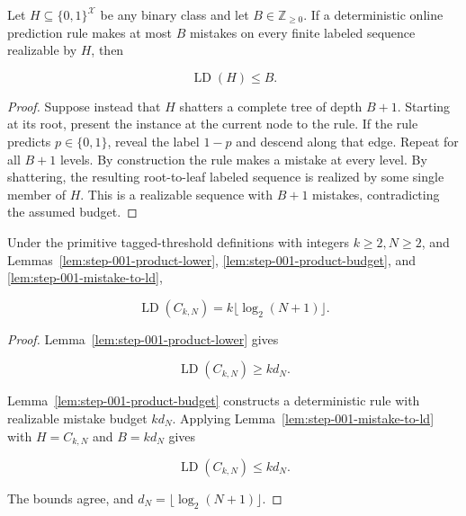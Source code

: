 \begin{lemma}\label{lem:step-001-mistake-to-ld}
Let \(H\subseteq\{0,1\}^{\mathcal X}\) be any binary class and let \(B\in\mathbb Z_{\ge0}\). If a deterministic online prediction rule makes at most \(B\) mistakes on every finite labeled sequence realizable by \(H\), then

\[
\operatorname{LD}(H)\le B.
\]
\end{lemma}

\begin{proof}
Suppose instead that \(H\) shatters a complete tree of depth \(B+1\). Starting at its root, present the instance at the current node to the rule. If the rule predicts \(p\in\{0,1\}\), reveal the label \(1-p\) and descend along that edge. Repeat for all \(B+1\) levels. By construction the rule makes a mistake at every level. By shattering, the resulting root-to-leaf labeled sequence is realized by some single member of \(H\). This is a realizable sequence with \(B+1\) mistakes, contradicting the assumed budget. \end{proof}

\begin{proposition}\label{prop:step-001-product-ld}
Under the primitive tagged-threshold definitions with integers \(k\ge2,N\ge2\), and Lemmas~\ref{lem:step-001-product-lower}, \ref{lem:step-001-product-budget}, and \ref{lem:step-001-mistake-to-ld},

\[
\operatorname{LD}(C_{k,N})
=k\lfloor\log_2(N+1)\rfloor.
\]
\end{proposition}

\begin{proof}
Lemma~\ref{lem:step-001-product-lower} gives

\[
\operatorname{LD}(C_{k,N})\ge kd_N.
\]

Lemma~\ref{lem:step-001-product-budget} constructs a deterministic rule with realizable mistake budget \(kd_N\). Applying Lemma~\ref{lem:step-001-mistake-to-ld} with \(H=C_{k,N}\) and \(B=kd_N\) gives

\[
\operatorname{LD}(C_{k,N})\le kd_N.
\]

The bounds agree, and \(d_N=\lfloor\log_2(N+1)\rfloor\). \end{proof}

